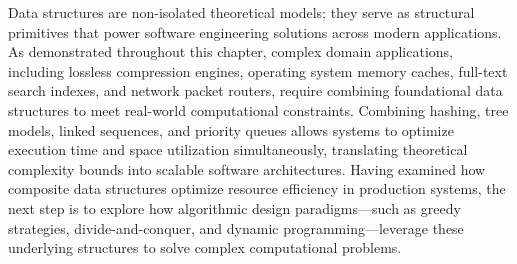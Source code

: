 \documentclass[12pt]{report}
\begin{document}
Data structures are non-isolated theoretical models; they serve as structural primitives that power software engineering solutions across modern applications. As demonstrated throughout this chapter, complex domain applications, including lossless compression engines, operating system memory caches, full-text search indexes, and network packet routers, require combining foundational data structures to meet real-world computational constraints. Combining hashing, tree models, linked sequences, and priority queues allows systems to optimize execution time and space utilization simultaneously, translating theoretical complexity bounds into scalable software architectures. Having examined how composite data structures optimize resource efficiency in production systems, the next step is to explore how algorithmic design paradigms—such as greedy strategies, divide-and-conquer, and dynamic programming—leverage these underlying structures to solve complex computational problems.
\end{document}
